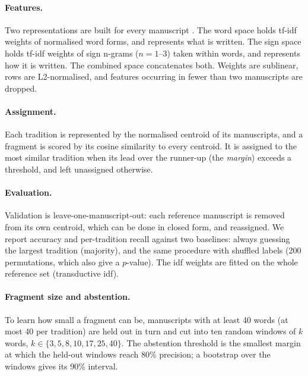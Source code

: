 \documentclass{ceurart}
\newcommand{\term}[1]{\textit{#1}}
\begin{document}
\paragraph{Features.}
Two representations are built for every manuscript \cite{salton1988weighting}. The word space
holds tf-idf weights of normalised word forms, and represents what is written. The sign space
holds tf-idf weights of sign n-grams ($n=1$--3) taken within words, and represents how it is
written. The combined space concatenates both. Weights are sublinear, rows are L2-normalised,
and features occurring in fewer than two manuscripts are dropped.

\paragraph{Assignment.}
Each tradition is represented by the normalised centroid of its manuscripts, and a fragment is
scored by its cosine similarity to every centroid. It is assigned to the most similar tradition
when its lead over the runner-up (the \term{margin}) exceeds a threshold, and left unassigned
otherwise.

\paragraph{Evaluation.}
Validation is leave-one-manuscript-out: each reference manuscript is removed from its own
centroid, which can be done in closed form, and reassigned. We report accuracy and per-tradition
recall against two baselines: always guessing the largest tradition (majority), and the same
procedure with shuffled labels (200 permutations, which also give a $p$-value). The idf weights
are fitted on the whole reference set (transductive idf).

\paragraph{Fragment size and abstention.}
To learn how small a fragment can be, manuscripts with at least 40 words (at most 40 per
tradition) are held out in turn and cut into ten random windows of $k$ words, $k \in \{3, 5, 8,
10, 17, 25, 40\}$. The abstention threshold is the smallest margin at which the held-out
windows reach 80\% precision; a bootstrap over the windows gives its 90\% interval.
\end{document}
